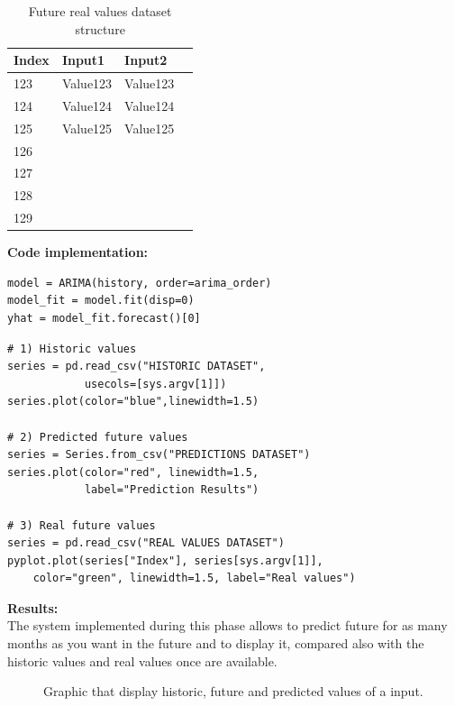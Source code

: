 \begin{table}[ht] 
    \centering 
    \begin{tabular}{ | l | l | l | p{5cm} |}
        \hline
        Index & Input1 & Input2 		\\ \hline
          	123 & Value123 & Value123 	\\ \hline
          	124 & Value124 & Value124 	\\ \hline
          	125 & Value125 & Value125 	\\ \hline
          	126 & 	&					\\ \hline
          	127 & 	&					\\ \hline
          	128 & 	&					\\ \hline
 			129 & 	&					\\ \hline
    \end{tabular}
    \caption{Future real values dataset structure}
    \label{table: pred_real_values} 
\end{table} 

\newpage

\textbf{Code implementation:}\\
\begin{lstlisting}
model = ARIMA(history, order=arima_order)
model_fit = model.fit(disp=0)
yhat = model_fit.forecast()[0]
\end{lstlisting}


\begin{lstlisting}
# 1) Historic values
series = pd.read_csv("HISTORIC DATASET", 
			usecols=[sys.argv[1]])
series.plot(color="blue",linewidth=1.5)

# 2) Predicted future values
series = Series.from_csv("PREDICTIONS DATASET")
series.plot(color="red", linewidth=1.5, 
			label="Prediction Results")

# 3) Real future values
series = pd.read_csv("REAL VALUES DATASET")
pyplot.plot(series["Index"], series[sys.argv[1]],
	color="green", linewidth=1.5, label="Real values")

\end{lstlisting}
\textbf{Results:}\\
The system implemented during this phase allows to predict future for as many months as you want in the future and to display it, compared also with the historic values and real values once are available.
\begin{figure}[H]
	\centering
    \caption{Graphic that display historic, future and predicted values of a input.}
\end{figure}

